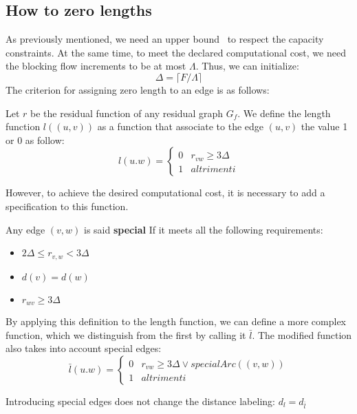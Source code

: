     \subsection{How to zero lengths}
    As previously mentioned, we need an upper bound \dlt\  to respect the capacity constraints. At the same time, to meet the declared computational cost, we need the blocking flow increments to be at most $\Lambda$.
    Thus, we can initialize:
    \[\Delta= \lceil F/\Lambda \rceil \]
    The criterion for assigning zero length to an edge is as follows:
    \begin{definition}
        Let $r$ be the residual function of any residual graph $G_f$. We define the length function $l((u,v))$ as a function that associate to the edge $(u,v)$ the value 1 or 0 as follow:
            \[l(u.w) = \left \{ \begin{array}{ll}
            0 & r_{vw} \ge 3\Delta\\
            1 & altrimenti
        \end{array} \right .\]
    \end{definition}
    
    However, to achieve the desired computational cost, it is necessary to add a specification to this function.
    \begin{definition}

        Any edge $(v,w)$ is said \textbf{special} If it meets all the following requirements:
        \begin{itemize}
            \item $2\Delta \le r_{v,w} < 3\Delta$
            \item $d(v) = d(w)$
            \item $r_{wv} \ge 3\Delta$
        \end{itemize}
    \end{definition}  
    

    By applying this definition to the length function, we can define a more complex function, which we distinguish from the first by calling it $\bar{l} $.
    The modified function also takes into account special edges:
    \[\bar{l}(u.w) = \left \{ \begin{array}{ll}
        0 & r_{vw} \ge 3\Delta \lor specialArc((v,w))\\
        1 & altrimenti
    \end{array} \right .\]
    \begin{obs}
        Introducing special edges does not change the distance labeling: $d_l = d_{\bar{l}}$
    \end{obs}


